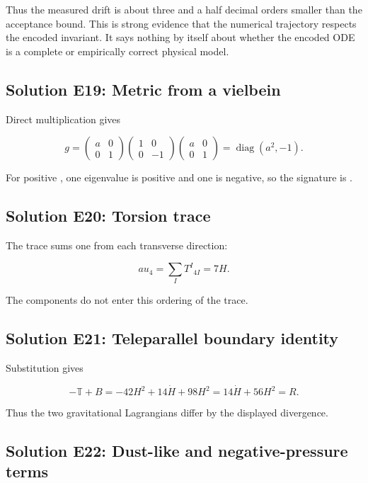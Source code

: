 \documentclass[11pt]{article}
\begin{document}
Thus the measured drift is about three and a half decimal orders smaller than the acceptance bound. This is strong evidence that the numerical trajectory respects the encoded invariant. It says nothing by itself about whether the encoded ODE is a complete or empirically correct physical model.

\subsection{Solution E19: Metric from a vielbein}

Direct multiplication gives

\[
g=\begin{pmatrix}a&0\\0&1\end{pmatrix}
\begin{pmatrix}1&0\\0&-1\end{pmatrix}
\begin{pmatrix}a&0\\0&1\end{pmatrix}
=\operatorname{diag}(a^2,-1).
\]

For positive \texttt{}, one eigenvalue is positive and one is negative, so the signature is \texttt{}.

\subsection{Solution E20: Torsion trace}

The trace sums one \texttt{} from each transverse direction:

\[
	au_4=\sum_I T^I{}_{4I}=7H.
\]

The components \texttt{} do not enter this ordering of the trace.

\subsection{Solution E21: Teleparallel boundary identity}

Substitution gives

\[
-\mathbb T+B=-42H^2+14\dot H+98H^2
=14\dot H+56H^2=R.
\]

Thus the two gravitational Lagrangians differ by the displayed divergence.

\subsection{Solution E22: Dust-like and negative-pressure terms}
\end{document}
